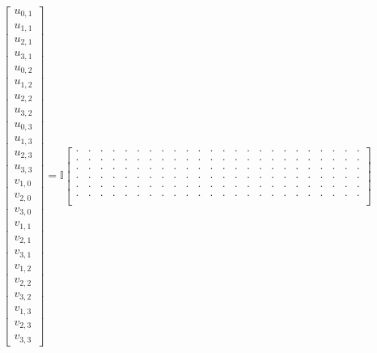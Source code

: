 \documentclass[a4paper,10pt]{scrreprt}
\let\d\cdot
\begin{document}
\begin{equation}
    \begin{bmatrix}
        u_{0,1} \\
        u_{1,1} \\
        u_{2,1} \\
        u_{3,1} \\
        u_{0,2} \\
        u_{1,2} \\
        u_{2,2} \\
        u_{3,2} \\
        u_{0,3} \\
        u_{1,3} \\
        u_{2,3} \\
        u_{3,3} \\
        v_{1,0} \\
        v_{2,0} \\
        v_{3,0} \\
        v_{1,1} \\
        v_{2,1} \\
        v_{3,1} \\
        v_{1,2} \\
        v_{2,2} \\
        v_{3,2} \\
        v_{1,3} \\
        v_{2,3} \\
        v_{3,3}
    \end{bmatrix}
    =
    \mathbb{I}
    \begin{bmatrix}
        \d & \d & \d & \d & \d & \d & \d & \d & \d & \d & \d & \d & \d & \d & \d & \d & \d & \d & \d & \d & \d & \d & \d & \d \\
        \d & \d & \d & \d & \d & \d & \d & \d & \d & \d & \d & \d & \d & \d & \d & \d & \d & \d & \d & \d & \d & \d & \d & \d \\
        \d & \d & \d & \d & \d & \d & \d & \d & \d & \d & \d & \d & \d & \d & \d & \d & \d & \d & \d & \d & \d & \d & \d & \d \\
        \d & \d & \d & \d & \d & \d & \d & \d & \d & \d & \d & \d & \d & \d & \d & \d & \d & \d & \d & \d & \d & \d & \d & \d \\
        \d & \d & \d & \d & \d & \d & \d & \d & \d & \d & \d & \d & \d & \d & \d & \d & \d & \d & \d & \d & \d & \d & \d & \d \\
        \d & \d & \d & \d & \d & \d & \d & \d & \d & \d & \d & \d & \d & \d & \d & \d & \d & \d & \d & \d & \d & \d & \d & \d \\

\end{bmatrix}
\end{equation}
\end{document}
